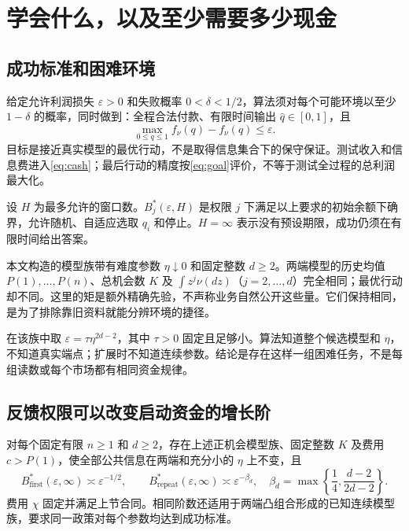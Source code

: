 \section{学会什么，以及至少需要多少现金}
\subsection{成功标准和困难环境}
给定允许利润损失 $\varepsilon>0$ 和失败概率 $0<\delta<1/2$，算法须对每个可能环境以至少 $1-\delta$ 的概率，同时做到：全程合法付款、有限时间输出 $\widehat q\in[0,1]$，且
\begin{equation}\label{eq:goal}
 \max_{0\leq q\leq1}f_\nu(q)-f_\nu(\widehat q)\leq\varepsilon.
\end{equation}
目标是接近真实模型的最优行动，不是取得信息集合下的保守保证。测试收入和信息费进入\eqref{eq:cash}；最后行动的精度按\eqref{eq:goal}评价，不等于测试全过程的总利润最大化。

设 $H$ 为最多允许的窗口数。$B_j^*(\varepsilon,H)$ 是权限 $j$ 下满足以上要求的初始余额下确界，允许随机、自适应选取 $q_i$ 和停止。$H=\infty$ 表示没有预设期限，成功仍须在有限时间给出答案。

本文构造的模型族带有难度参数 $\eta\downarrow0$ 和固定整数 $d\geq2$。两端模型的历史均值 $P(1),\ldots,P(n)$、总机会数 $K$ 及 $\int z^j\nu(dz)$（$j=2,\ldots,d$）完全相同；最优行动却不同。这里的矩是额外精确先验，不声称业务自然公开这些量。它们保持相同，是为了排除靠旧资料就能分辨环境的捷径。

在该族中取 $\varepsilon=\tau\eta^{2d-2}$，其中 $\tau>0$ 固定且足够小。算法知道整个候选模型和 $\eta$，不知道真实端点；扩展时不知道连续参数。结论是存在这样一组困难任务，不是每组读数或每个市场都有相同资金规律。

\subsection{反馈权限可以改变启动资金的增长阶}
\begin{theorem}[同一行动精度下的最低启动资金]\label{thm:capital}
对每个固定有限 $n\geq1$ 和 $d\geq2$，存在上述正机会模型族、固定整数 $K$ 及费用 $c>P(1)$，使全部公共信息在两端和充分小的 $\eta$ 上不变，且
\begin{equation}\label{eq:capital}
 B^*_{\mathrm{first}}(\varepsilon,\infty)\asymp\varepsilon^{-1/2},
 \qquad
 B^*_{\mathrm{repeat}}(\varepsilon,\infty)\asymp\varepsilon^{-\beta_d},
 \quad \beta_d=\max\left\{\frac14,\frac{d-2}{2d-2}\right\}.
\end{equation}
费用 $\chi$ 固定并满足上节合同。相同阶数还适用于两端凸组合形成的已知连续模型族，要求同一政策对每个参数均达到成功标准。
\end{theorem}

